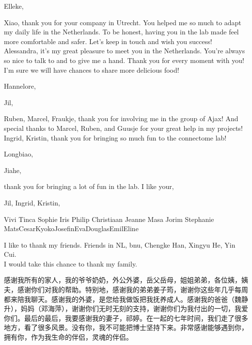 Elleke, 


Xiao, thank you for your company in Utrecht. You helped me so much to adapt my daily life in the Netherlands. To be honest, having you in the lab made feel more comfortable and safer. Let's keep in touch and wish you success! Alessandra, it's my great pleasure to meet you in the Netherlands. You're always so nice to talk to and to give me a hand. Thank you for every moment with you! I'm sure we will have chances to share more delicious food! 


Hannelore,

Jil,

Ruben, Marcel, Fraukje, thank you for involving me in the group of Ajax! And special thanks to Marcel, Ruben, and Guusje for your great help in my projects! Ingrid, Kristin, thank you for bringing so much fun to the connectome lab!


Longbiao,

Jiahe,



thank you for bringing a lot of fun in the lab. I like your,



Jil, Ingrid, Kristin, 


Vivi
Tinca 
Sophie
Iris
Philip
Christiaan
Jeanne
Masa
Jorim
Stephanie
MatsCesarKyokoJosefinEvaDouglasEmilEline


I like to thank my friends. Friends in NL, bnu, Chengke Han, Xingyu He, Yin Cui. \\

I would take this chance to thank my family. 
\begin{CJK*}{UTF8}{gbsn}
感谢我所有的家人，我的爷爷奶奶，外公外婆，岳父岳母，姐姐弟弟，各位姨，姨夫，感谢你们对我的帮助。特别地，感谢我的弟弟姜子筠，谢谢你这些年几乎每周都来陪我聊天。感谢我的外婆，是您给我做饭把我抚养成人。感谢我的爸爸（魏静升），妈妈（邓海萍），谢谢你们无时无刻的支持，谢谢你们为我付出的一切，我爱你们。最后的最后，我要感谢我的妻子，祁婷。在一起的七年时间，我们走了很多地方，看了很多风景。没有你，我不可能把博士坚持下来。非常感谢能够遇到你，拥有你，作为我生命的伴侣，灵魂的伴侣。
\end{CJK*} 

